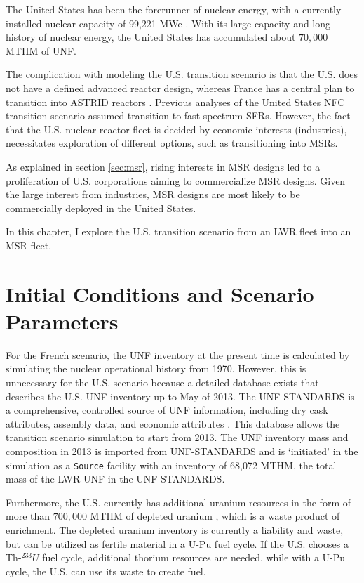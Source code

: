 The United States has been the forerunner of nuclear energy, with a currently 
installed nuclear capacity of 99,221 \gls{MWe} \cite{iaea_nuclear_2017}.
With its large capacity and long history of nuclear
energy, the United States has accumulated about $70,000$ \gls{MTHM} of \gls{UNF}.

The complication with modeling the U.S. transition scenario is that the U.S. does not have
a defined advanced reactor design, whereas France has a central plan to transition into \gls{ASTRID} reactors \cite{boullis_french_2015, varaine_pre-conceptual_2012}.
Previous analyses of the United States \cite{worrall_utilization_2013, sunny_transition_2015}
 \gls{NFC} transition scenario
assumed transition to fast-spectrum \glspl{SFR}.
However, the fact that the U.S. nuclear reactor fleet
is decided by economic interests (industries), necessitates
exploration of different options, such as transitioning into \glspl{MSR}.

As explained in section \ref{sec:msr}, rising interests in \gls{MSR} designs
led to a proliferation of U.S. corporations aiming to commercialize
\gls{MSR} designs. Given the large interest from industries,
\gls{MSR} designs are
most likely to be commercially deployed in the United States.

In this chapter, I explore the U.S. transition scenario
from an \gls{LWR} fleet into an \gls{MSR} fleet.

\section{Initial Conditions and Scenario Parameters}

For the French scenario, the \gls{UNF} inventory at the present
time is calculated by simulating the nuclear operational history from 1970.
However, this is unnecessary for the U.S. scenario because a detailed
database exists that describes the U.S. \gls{UNF} inventory up to May of 2013.
The \gls{UNF-STANDARDS} is a comprehensive,
controlled source of \gls{UNF} information, including dry cask attributes, assembly
data, and economic attributes \cite{peterson_unf-st&dards_2017}. This database
allows the transition scenario simulation to start from 2013. The \gls{UNF} inventory mass and composition in 2013
is imported from \gls{UNF-STANDARDS} and is `initiated' in the simulation
as a \texttt{Source} facility with an inventory of 68,072 MTHM,
the total mass of the \gls{LWR} \gls{UNF} in the \gls{UNF-STANDARDS}.

Furthermore, the U.S. currently has additional uranium resources in the
form of more than $700,000$ MTHM of depleted uranium \cite{office_nuclear_2011},
which is a waste product of enrichment. The depleted uranium inventory
is currently a liability and waste, but can be utilized as fertile material
in a U-Pu fuel cycle. If the U.S. chooses a Th-$^{233}U$ fuel cycle,
additional thorium resources are needed, while with a U-Pu cycle, the
U.S. can use its waste to create fuel.

